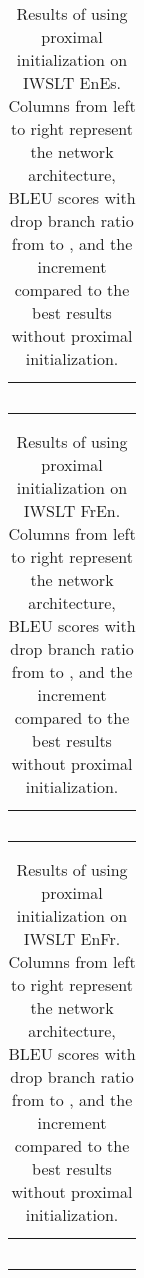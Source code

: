 \documentclass{article}
\begin{document}
\begin{table}[!htbp]
\centering
\caption{Results of using proximal initialization on IWSLT EnEs. Columns from left to right represent the network architecture, BLEU scores with drop branch ratio  from  to , and the increment compared to the best results without proximal initialization.}
\begin{tabular}{cccccccc}
\toprule
&     &    &    &     &    \\
\midrule
 &   &	 &  &   &  \\
 &   &		&  &	  &  \\
 &   &		&  &	  &  \\
 &   & 	&  &   &  \\
 &   &		&  &	  &  \\
\bottomrule
\end{tabular}
\label{tab:result_iwslt_enes}
\end{table}


\begin{table}[!htbp]
\centering
\caption{Results of using proximal initialization on IWSLT FrEn. Columns from left to right represent the network architecture, BLEU scores with drop branch ratio  from  to , and the increment compared to the best results without proximal initialization.}
\begin{tabular}{cccccccc}
\toprule
&     &    &    &     &    \\
\midrule
 &   &	 &  &   &  \\
 &   &		&  &	  &  \\
 &   &		&  &	  &  \\
 &   & 	&  &   &  \\
 &   &		&  &	  &  \\
\bottomrule
\end{tabular}
\label{tab:result_iwslt_fren}
\end{table}


\begin{table}[!htbp]
\centering
\caption{Results of using proximal initialization on IWSLT EnFr. Columns from left to right represent the network architecture, BLEU scores with drop branch ratio  from  to , and the increment compared to the best results without proximal initialization.}
\begin{tabular}{cccccccc}
\toprule
&     &    &    &     &    \\
\midrule
 &   &	 &  &   &  \\
 &   &		&  &	  &  \\
 &   &		&  &	  &  \\
 &   & 	&  &   &  \\
 &   &		&  &	  &  \\
\bottomrule
\end{tabular}
\label{tab:result_iwslt_enfr}
\end{table}
\end{document}
